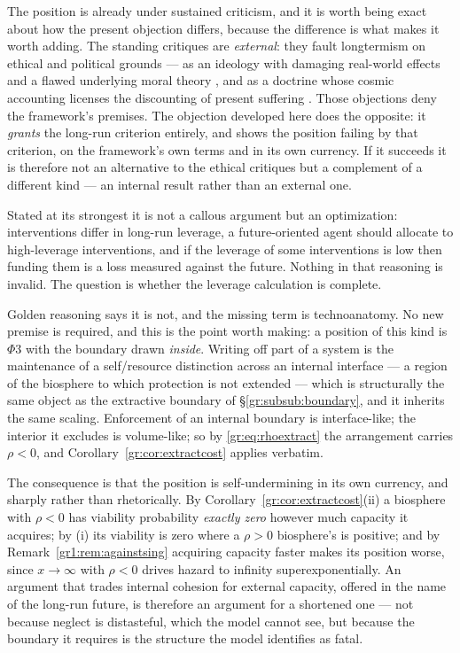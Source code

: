 \documentclass[11pt]{article}
\numberwithin{equation}{section}
\theoremstyle{plain}
\theoremstyle{definition}
\theoremstyle{remark}
\begin{document}
The position is already under sustained criticism, and it is worth being
exact about how the present objection differs, because the difference is
what makes it worth adding. The standing critiques are \emph{external}:
they fault longtermism on ethical and political grounds --- as an
ideology with damaging real-world effects and a flawed underlying moral
theory \cite{Crary23}, and as a doctrine whose cosmic accounting
licenses the discounting of present suffering \cite{Torres21}. Those
objections deny the framework's premises. The objection developed here
does the opposite: it \emph{grants} the long-run criterion entirely, and
shows the position failing by that criterion, on the framework's own
terms and in its own currency. If it succeeds it is therefore not an
alternative to the ethical critiques but a complement of a different
kind --- an internal result rather than an external one.

Stated at its strongest it is not a callous argument but an
optimization: interventions differ in long-run leverage, a
future-oriented agent should allocate to high-leverage interventions,
and if the leverage of some interventions is low then funding them is a
loss measured against the future. Nothing in that reasoning is invalid.
The question is whether the leverage calculation is complete.

Golden reasoning says it is not, and the missing term is technoanatomy.
No new premise is required, and this is the point worth making: a
position of this kind is $\Phi3$ with the boundary drawn \emph{inside}.
Writing off part of a system is the maintenance of a self/resource
distinction across an internal interface --- a region of the biosphere
to which protection is not extended --- which is structurally the same
object as the extractive boundary of \S\ref{gr:subsub:boundary}, and it
inherits the same scaling. Enforcement of an internal boundary is
interface-like; the interior it excludes is volume-like; so by
\eqref{gr:eq:rhoextract} the arrangement carries $\rho<0$, and
Corollary~\ref{gr:cor:extractcost} applies verbatim.

The consequence is that the position is self-undermining in its own
currency, and sharply rather than rhetorically. By
Corollary~\ref{gr:cor:extractcost}(ii) a biosphere with $\rho<0$ has
viability probability \emph{exactly zero} however much capacity it
acquires; by (i) its viability is zero where a $\rho>0$ biosphere's is
positive; and by
Remark~\ref{gr1:rem:againstsing} acquiring capacity faster makes its
position worse, since $x\to\infty$ with $\rho<0$ drives hazard to
infinity superexponentially. An argument that trades internal cohesion
for external capacity, offered in the name of the long-run future, is
therefore an argument for a shortened one --- not because neglect is
distasteful, which the model cannot see, but because the boundary it
requires is the structure the model identifies as fatal.
\end{document}
